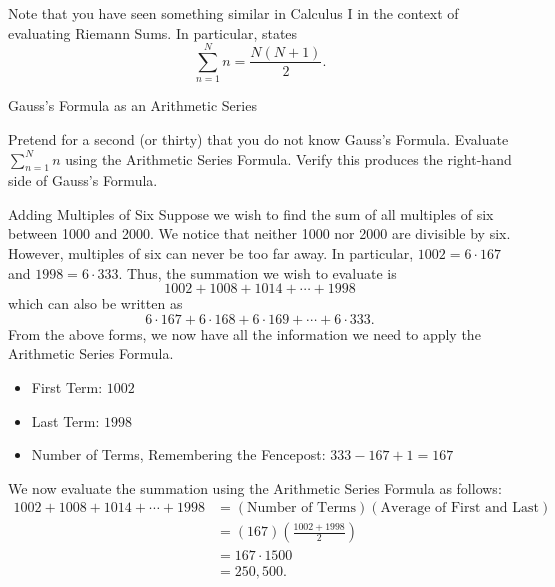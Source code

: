 Note that you have seen something similar in Calculus I in the context of evaluating Riemann Sums.  In particular,  states $$ \sum_{n=1}^Nn=\frac{N\left(N+1\right)}{2}.$$

\begin{exercise}{Gauss's Formula as an Arithmetic Series \Coffeecup \Coffeecup}

Pretend for a second (or thirty) that you do not know Gauss's Formula.  Evaluate $\sum_{n=1}^Nn$ using the Arithmetic Series Formula.  Verify this produces the right-hand side of Gauss's Formula.  
\vspace*{1in}
\end{exercise}

\begin{example}{Adding Multiples of Six }
Suppose we wish to find the sum of all multiples of six between 1000 and 2000.  We notice that neither 1000 nor 2000 are divisible by six. However, multiples of six can never be too far away.  In particular, $1002=6\cdot167$ and $1998=6\cdot 333$.  Thus, the summation we wish to evaluate is $$1002+1008+1014+\cdots+1998 $$ which can also be written as $$6\cdot167+6\cdot168+6\cdot169+\cdots+6\cdot333. $$  From the above forms, we now have all the information we need to apply the Arithmetic Series Formula.
\begin{itemize}
\item First Term: $1002$
\item Last Term: $1998$
\item Number of Terms, Remembering the Fencepost: $333-167+1=167$
\end{itemize}
We now evaluate the summation using the Arithmetic Series Formula as follows: \begin{align*}
1002+1008+1014+\cdots+1998 &=\left(\text{Number of Terms}\right)\left(\text{Average of First and Last}\right)\\ 
&=\left(167\right)\left(\frac{1002+1998}{2}\right)\\
&=167\cdot 1500 \\
&=250,500.
\end{align*}
\end{example}

